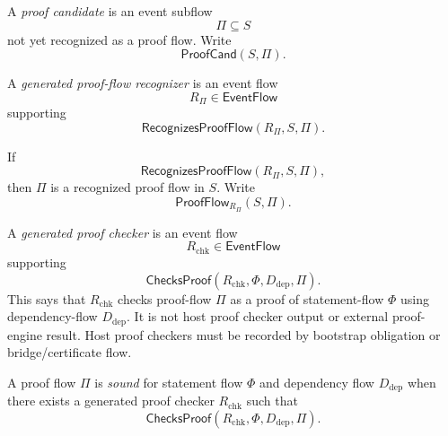 \begin{definition}
\label{def:theorem-proof-proof-candidate}
A \emph{proof candidate} is an event subflow
$$
  \Pi\subseteq S
$$
not yet recognized as a proof flow. Write
$$
  \mathsf{ProofCand}(S,\Pi).
$$
\end{definition}

\begin{definition}
\label{def:theorem-proof-generated-proof-recognizer}
A \emph{generated proof-flow recognizer} is an event flow
$$
  R_{\Pi}\in\mathsf{EventFlow}
$$
supporting
$$
  \mathsf{RecognizesProofFlow}(R_{\Pi},S,\Pi).
$$
\end{definition}

\begin{definition}
\label{def:theorem-proof-recognized-proof-flow}
If
$$
  \mathsf{RecognizesProofFlow}(R_{\Pi},S,\Pi),
$$
then $\Pi$ is a recognized proof flow in $S$. Write
$$
  \mathsf{ProofFlow}_{R_{\Pi}}(S,\Pi).
$$
\end{definition}

\begin{definition}
\label{def:theorem-proof-generated-checker}
A \emph{generated proof checker} is an event flow
$$
  R_{\mathrm{chk}}\in\mathsf{EventFlow}
$$
supporting
$$
  \mathsf{ChecksProof}(R_{\mathrm{chk}},\Phi,D_{\mathrm{dep}},\Pi).
$$
This says that $R_{\mathrm{chk}}$ checks proof-flow $\Pi$ as a proof of statement-flow $\Phi$ using dependency-flow $D_{\mathrm{dep}}$. It is not host proof checker output or external proof-engine result. Host proof checkers must be recorded by bootstrap obligation or bridge/certificate flow.
\end{definition}

\begin{definition}
\label{def:theorem-proof-proof-soundness}
A proof flow $\Pi$ is \emph{sound} for statement flow $\Phi$ and dependency flow $D_{\mathrm{dep}}$ when there exists a generated proof checker $R_{\mathrm{chk}}$ such that
$$
  \mathsf{ChecksProof}(R_{\mathrm{chk}},\Phi,D_{\mathrm{dep}},\Pi).
$$
\end{definition}


